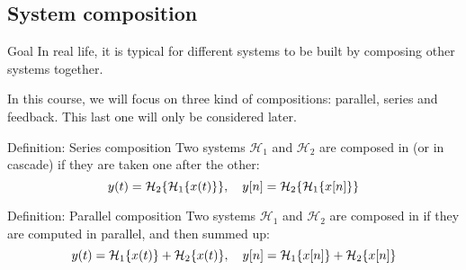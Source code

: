 \documentclass[a4paper]{article}
\begin{document}
\subsection{System composition} 

\begin{parag}{Goal}
    In real life, it is typical for different systems to be built by composing other systems together.

    In this course, we will focus on three kind of compositions: parallel, series and feedback. This last one will only be considered later.
\end{parag}

\begin{parag}{Definition: Series composition}
    Two systems $\mathcal{H}_1$ and $\mathcal{H}_2$ are composed in  (or in cascade) if they are taken one after the other: 
    \[y\left(t\right) = \mathcal{H}_2\left\{\mathcal{H}_1\left\{x\left(t\right)\right\}\right\}, \mathspace y\left[n\right] = \mathcal{H}_2\left\{\mathcal{H}_1\left\{x\left[n\right]\right\}\right\}\]

\end{parag}

\begin{parag}{Definition: Parallel composition}
    Two systems $\mathcal{H}_1$ and $\mathcal{H}_2$ are composed in  if they are computed in parallel, and then summed up: 
    \[y\left(t\right) = \mathcal{H}_1\left\{x\left(t\right)\right\} + \mathcal{H}_2\left\{x\left(t\right)\right\}, \mathspace y\left[n\right] = \mathcal{H}_1\left\{x\left[n\right]\right\} + \mathcal{H}_2\left\{x\left[n\right]\right\}\]
    
\end{parag}
\end{document}
